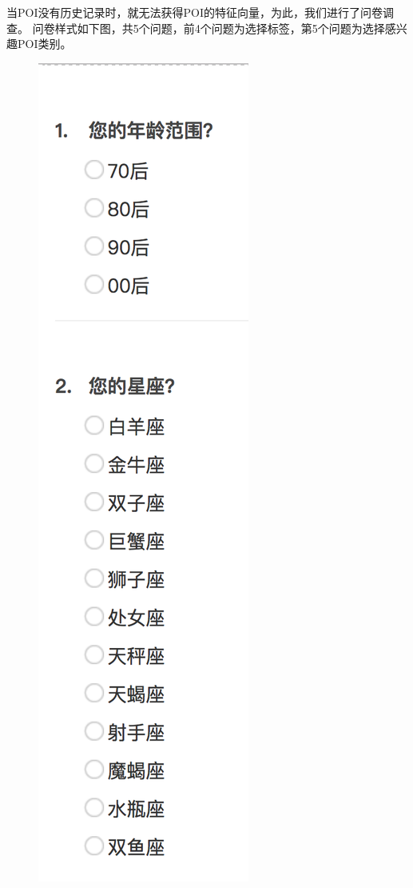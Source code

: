 \documentclass[UTF8]{article}
\begin{document}
当POI没有历史记录时，就无法获得POI的特征向量，为此，我们进行了问卷调查。
问卷样式如下图，共5个问题，前4个问题为选择标签，第5个问题为选择感兴趣POI类别。
\begin{figure}[H]
\begin{minipage}[t]{0.15\textwidth}
    \vspace{0pt}
    \includegraphics[width=\textwidth]{images/ques1.png}

\end{minipage}
\end{figure}
\end{document}
